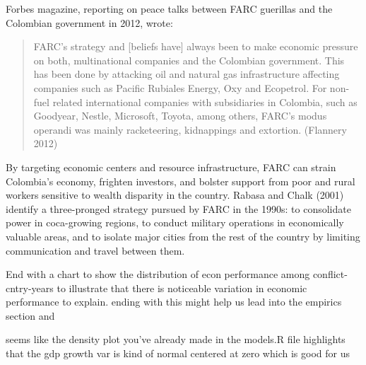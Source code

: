 Forbes magazine, reporting on peace talks between FARC guerillas and the Colombian government in 2012, wrote: 
\begin{quote}FARC's strategy and [beliefs have] always been to make economic pressure on both, multinational companies and the Colombian government. This has been done by attacking oil and natural gas infrastructure affecting companies such as Pacific Rubiales Energy, Oxy and Ecopetrol. For non-fuel related international companies with subsidiaries in Colombia, such as Goodyear, Nestle, Microsoft, Toyota, among others, FARC’s modus operandi was mainly racketeering, kidnappings and extortion. (Flannery 2012)\end{quote}
By targeting economic centers and resource infrastructure, FARC can strain Colombia's economy, frighten investors, and bolster support from poor and rural workers sensitive to wealth disparity in the country.  Rabasa and Chalk (2001) identify a three-pronged strategy pursued by FARC in the 1990s: to consolidate power in coca-growing regions, to conduct military operations in economically valuable areas, and to isolate major cities from the rest of the country by limiting communication and travel between them.    


End with a chart to show the distribution of econ performance among conflict-cntry-years to illustrate that there is noticeable variation in economic performance to explain. ending with this might help us lead into the empirics section and 

	seems like the density plot you've already made in the models.R file highlights that the gdp growth var is kind of normal centered at zero which is good for us	